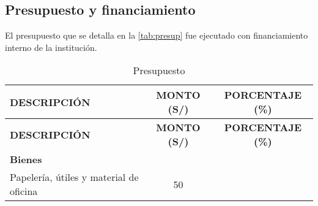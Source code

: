 \documentclass[a4paper]{article}
\begin{document}
\subsection{Presupuesto y
financiamiento}\label{presupuesto-y-financiamiento}

El presupuesto que se detalla en la \autoref{tab:presup} fue ejecutado
con financiamiento interno de la institución.

\begin{longtable}[]{@{}lcc@{}}
\caption{Presupuesto \label{tab:presup}}\tabularnewline
\toprule
\begin{minipage}[b]{0.46\columnwidth}\raggedright\strut
\textbf{DESCRIPCIÓN}\strut
\end{minipage} & \begin{minipage}[b]{0.22\columnwidth}\centering\strut
\textbf{MONTO (S/)}\strut
\end{minipage} & \begin{minipage}[b]{0.22\columnwidth}\centering\strut
\textbf{PORCENTAJE (\%)}\strut
\end{minipage}\tabularnewline
\midrule
\endfirsthead
\toprule
\begin{minipage}[b]{0.46\columnwidth}\raggedright\strut
\textbf{DESCRIPCIÓN}\strut
\end{minipage} & \begin{minipage}[b]{0.22\columnwidth}\centering\strut
\textbf{MONTO (S/)}\strut
\end{minipage} & \begin{minipage}[b]{0.22\columnwidth}\centering\strut
\textbf{PORCENTAJE (\%)}\strut
\end{minipage}\tabularnewline
\midrule
\endhead
\begin{minipage}[t]{0.46\columnwidth}\raggedright\strut
\textbf{Bienes}\strut
\end{minipage} & \begin{minipage}[t]{0.22\columnwidth}\centering\strut
\strut
\end{minipage} & \begin{minipage}[t]{0.22\columnwidth}\centering\strut
\strut
\end{minipage}\tabularnewline
\begin{minipage}[t]{0.46\columnwidth}\raggedright\strut
Papelería, útiles y material de oficina\strut
\end{minipage} & \begin{minipage}[t]{0.22\columnwidth}\centering\strut
50\strut
\end{minipage} & \begin{minipage}[t]{0.22\columnwidth}\centering\strut

\end{minipage}
\end{longtable}
\end{document}
